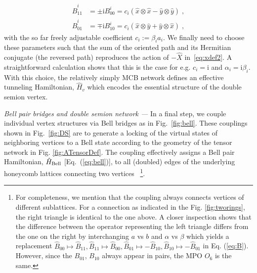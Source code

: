 \documentclass[twocolumn,floats,prx,showpacs]{revtex4-1}
\begin{document}
\begin{align}
\hat B^i_{11}&=\pm \mathrm{i}B^i_{00}=  c_i(  \hat x \otimes \hat x -  \hat y \otimes \hat y)  \;, \label{eq:B} \\
\hat B^i_{01}&=\mp\mathrm{i}B^i_{10}= c_i(\hat x \otimes \hat y + \hat y \otimes \hat x)  \;, \nonumber
\end{align}
with the so far freely adjustable coefficient $c_i:=  \beta_i a_i$. We finally need to choose these parameters such that the sum of the oriented path and its Hermitian conjugate (the reversed path) reproduces the action of $-\hat X$ in~\eqref{eq:xdef2}. A straightforward calculation shows that this is the case for e.g. $c_i =\mathrm{i}$ and $\alpha_i=\mathrm i \beta_i$. With this choice, the relatively simply MCB network defines an effective  tunneling Hamiltonian, $\hat H_v$ which  encodes the essential structure of the double semion vertex.   


\emph{Bell pair bridges and double semion network ---}
In a final step, we couple individual vertex structures  via Bell bridges as in Fig.~\ref{fig:bell}. These couplings shown in Fig.~\ref{fig:DS} are to generate a locking of the virtual states of neighboring vertices to a Bell state according to the geometry of the tensor network in Fig. \ref{fig:ATensorDef}. The coupling effectively assigns a Bell pair Hamiltonian, $\hat H_{\rm Bell}$ [Eq.~(\ref{eq:bell})], to all (doubled) edges of the underlying honeycomb lattices connecting two vertices
~\footnote{For completeness, we mention that the coupling always connects vertices of different sublattices. For a connection as indicated in the Fig. \ref{fig:tworings}, the right triangle is identical to the one above. A closer inspection shows that the difference between the operator representing the left triangle differs from the one on the right by interchanging $a$ vs $b$ and $\alpha$ vs $\beta$ which yields a replacement $\hat B_{00}\mapsto \hat B_{11}, \hat B_{11}\mapsto \hat B_{00}, \hat B_{01}\mapsto -\hat B_{10},\hat B_{10}\mapsto - \hat B_{01}$ in Eq. (\ref{eq:B}). However, since the $B_{01}$, $B_{10}$ always appear in pairs, the MPO $O_6$ is the same.}.
\end{document}

